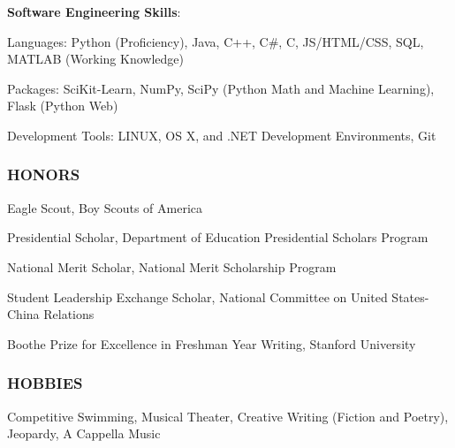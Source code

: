 \documentclass[11pt,letterpaper]{article}%
\begin{document}
\hspace{.6em}
{\bf Software Engineering Skills}:

\hspace{2.4em} 
Languages: Python (Proficiency), Java, C++, C\#, C, JS/HTML/CSS, SQL, MATLAB (Working Knowledge)

\hspace{2.4em} 
Packages: SciKit-Learn, NumPy, SciPy (Python Math and Machine Learning), Flask (Python Web)

\hspace{2.4em} Development Tools: LINUX, OS X, and .NET Development Environments, Git

\vspace{-.5em}
\hrulefill 
\subsubsection*{HONORS}

\begin{itemize*}
\item Eagle Scout, Boy Scouts of America
\item Presidential Scholar, Department of Education Presidential Scholars Program
\item National Merit Scholar, National Merit Scholarship Program
\item Student Leadership Exchange Scholar, National Committee on United States-China Relations
\item Boothe Prize for Excellence in Freshman Year Writing, Stanford University
\end{itemize*}

\vspace{-1em}
\hrulefill 
\subsubsection*{HOBBIES}

\hspace{.6em}
Competitive Swimming, Musical Theater, Creative Writing (Fiction and Poetry), Jeopardy, A Cappella Music

\vspace{-.6em}
\end{document}

